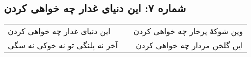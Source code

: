 \begin{center}
\section*{شماره ۷: این دنیای غدار چه خواهی کردن}
\label{sec:007}
\begin{longtable}{l p{0.5cm} r}
این دنیای غدار چه خواهی کردن
&&
وین شوکهٔ پرخار چه خواهی کردن
\\
آخر نه پلنگی تو نه خوکی نه سگی
&&
این گلخن مردار چه خواهی کردن
\\
\end{longtable}
\end{center}
